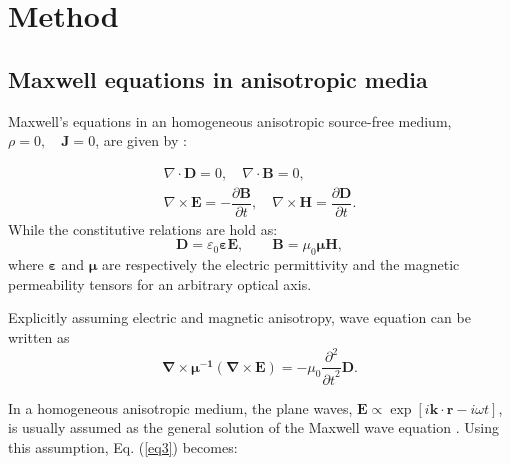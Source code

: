 \documentclass[9pt,twocolumn,twoside]{osajnl}
\begin{document}
 
\section{ Method}



\subsection{Maxwell equations in anisotropic media}\label{Maxwell's equations in the homogeneous anisotropic media}

 Maxwell's equations in an homogeneous anisotropic source-free medium, $\rho=0, \quad \mathbf{J}=0 $,  are given by \cite{jackson1962classical}:

\begin{gather}
\nabla\cdot \mathbf{D} =0,\quad \nabla\cdot \mathbf{B} =0, \nonumber \\
\nabla\times\mathbf{E}=-\dfrac{\partial\mathbf{B}}{\partial t}, \quad \nabla\times\mathbf{H} =\dfrac{\partial\mathbf{D}}{\partial t}.\label{m.h}
\end{gather}
While the constitutive relations are hold as:
 \begin{equation} 
 \mathbf {D}=\varepsilon_0 \boldsymbol \varepsilon \mathbf{E},  \qquad
  \mathbf{B}=\mu_0 \boldsymbol\mu \mathbf{H},
  \end{equation}
where $\boldsymbol{\varepsilon}$ and $\boldsymbol{\mu}$  are respectively the electric permittivity and  the magnetic permeability tensors for an arbitrary optical axis. 

 Explicitly assuming electric and magnetic anisotropy, wave equation can be written as
\begin{equation}
\mathbf{\nabla}\times{\boldsymbol{\mu^{-1}}(\mathbf{\nabla}\times\mathbf{E})}=-\mu_{0}\dfrac{\partial^{2}}{{\partial{t}}^{2}}\mathbf{D}.
\label{eq3}
\end{equation}

In a homogeneous anisotropic medium, the plane waves, $ \mathbf{E}\propto \exp\left[i\mathbf{k} \cdot  \mathbf{r}- i\omega t \right]$, is usually assumed as the general solution of the Maxwell wave equation \cite{hao2008electromagnetic}. Using this assumption, Eq. (\ref{eq3}) becomes:
   
\end{document}
